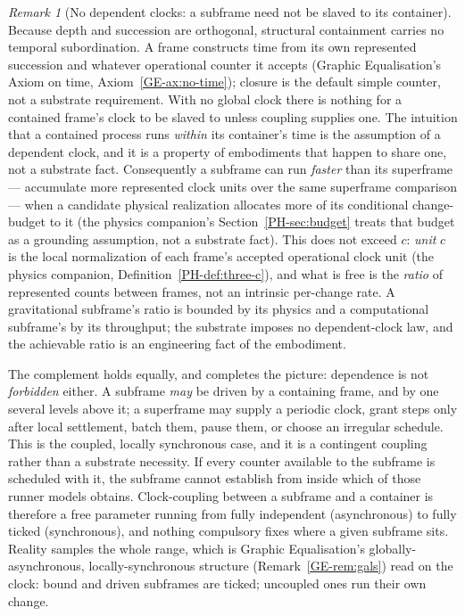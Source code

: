 \documentclass[11pt,a4paper]{article}
\theoremstyle{remark}
\newtheorem{remark}[definition]{Remark}
\begin{document}
\begin{remark}[No dependent clocks: a subframe need not be slaved to its container]\label{rem:no-dependent-clocks}
Because depth and succession are orthogonal, structural containment carries no temporal subordination. A frame constructs time from its own represented succession and whatever operational counter it accepts (Graphic Equalisation's Axiom on time, Axiom~\ref{GE-ax:no-time}); closure is the default simple counter, not a substrate requirement. With no global clock there is nothing for a contained frame's clock to be slaved to unless coupling supplies one. The intuition that a contained process runs \emph{within} its container's time is the assumption of a dependent clock, and it is a property of embodiments that happen to share one, not a substrate fact. Consequently a subframe can run \emph{faster} than its superframe --- accumulate more represented clock units over the same superframe comparison --- when a candidate physical realization allocates more of its conditional change-budget to it (the physics companion's Section~\ref{PH-sec:budget} treats that budget as a grounding assumption, not a substrate fact). This does not exceed $c$: \emph{unit} $c$ is the local normalization of each frame's accepted operational clock unit (the physics companion, Definition~\ref{PH-def:three-c}), and what is free is the \emph{ratio} of represented counts between frames, not an intrinsic per-change rate. A gravitational subframe's ratio is bounded by its physics and a computational subframe's by its throughput; the substrate imposes no dependent-clock law, and the achievable ratio is an engineering fact of the embodiment.

The complement holds equally, and completes the picture: dependence is not \emph{forbidden} either. A subframe \emph{may} be driven by a containing frame, and by one several levels above it; a superframe may supply a periodic clock, grant steps only after local settlement, batch them, pause them, or choose an irregular schedule. This is the coupled, locally synchronous case, and it is a contingent coupling rather than a substrate necessity. If every counter available to the subframe is scheduled with it, the subframe cannot establish from inside which of those runner models obtains. Clock-coupling between a subframe and a container is therefore a free parameter running from fully independent (asynchronous) to fully ticked (synchronous), and nothing compulsory fixes where a given subframe sits. Reality samples the whole range, which is Graphic Equalisation's globally-asynchronous, locally-synchronous structure (Remark~\ref{GE-rem:gals}) read on the clock: bound and driven subframes are ticked; uncoupled ones run their own change.
\end{remark}
\end{document}
